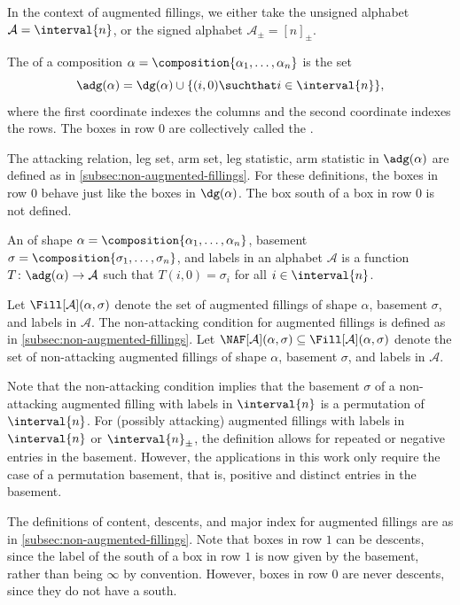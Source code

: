 In the context of augmented fillings,
we either take the unsigned alphabet \(\mathcal{A} = \interval{n}\),
or the signed alphabet \(\mathcal{A}_\pm = [n]_\pm\).

The  of a composition
\(\alpha = \composition{\alpha_1, \ldots, \alpha_n}\)
is the set
\begin{equation*}
	\adg(\alpha) = \dg(\alpha) \cup \{(i, 0) \suchthat i \in \interval{n}\},
\end{equation*}
where the first coordinate indexes the columns and the second coordinate indexes the rows.
The boxes in row \(0\) are collectively called the .

The attacking relation, leg set, arm set, leg statistic, arm statistic in \(\adg(\alpha)\) are defined as in \cref{subsec:non-augmented-fillings}.
For these definitions, the boxes in row \(0\) behave just like the boxes in \(\dg(\alpha)\).
The box south of a box in row \(0\) is not defined.

An  of shape \(\alpha = \composition{\alpha_1, \ldots, \alpha_n}\), basement \(\sigma = \composition{\sigma_1, \ldots, \sigma_n}\), and labels in an alphabet \(\mathcal{A}\) is a function \(T \colon \adg(\alpha) \to \mathcal{A}\) such that \(T(i, 0) = \sigma_i\) for all \(i \in \interval{n}\).

Let \(\Fill[\mathcal{A}](\alpha, \sigma)\) denote the set of augmented fillings of shape \(\alpha\), basement \(\sigma\), and labels in \(\mathcal{A}\).
The non-attacking condition for augmented fillings is defined as in \cref{subsec:non-augmented-fillings}.
Let \(\NAF[\mathcal{A}](\alpha, \sigma) \subseteq \Fill[\mathcal{A}](\alpha, \sigma)\) denote the set of non-attacking augmented fillings of shape \(\alpha\), basement \(\sigma\), and labels in \(\mathcal{A}\).

Note that the non-attacking condition implies that the basement \(\sigma\) of a non-attacking augmented filling with labels in \(\interval{n}\) is a permutation of \(\interval{n}\).
For (possibly attacking) augmented fillings with labels in \(\interval{n}\) or \(\interval{n}_\pm\), the definition allows for repeated or negative entries in the basement.
However, the applications in this work only require the case of a permutation basement, that is, positive and distinct entries in the basement.

The definitions of content, descents, and major index for augmented fillings are as in \cref{subsec:non-augmented-fillings}.
Note that boxes in row \(1\) can be descents, since the label of the south of a box in row \(1\) is now given by the basement, rather than being \(\infty\) by convention.
However, boxes in row \(0\) are never descents, since they do not have a south.

